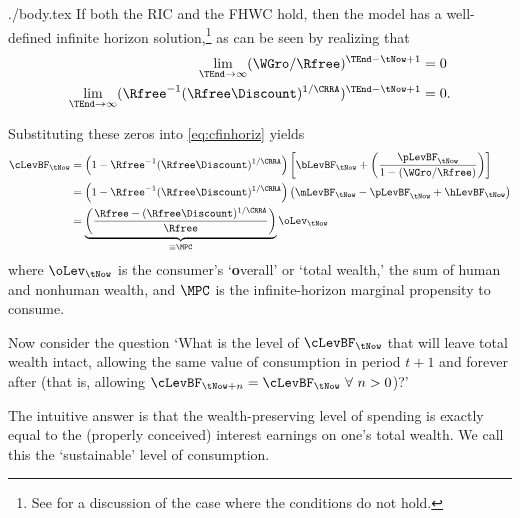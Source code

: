 \documentclass{handout}
\begin{document}
\begin{verbatimwrite}{./body.tex}
If both the RIC and the FHWC hold, then the model has a well-defined 
infinite horizon solution,\footnote{See \cite{BufferStockTheory} for a discussion of the case where the conditions do not hold.} as can be seen by realizing that 
\begin{equation}\begin{gathered}\begin{aligned}
   \lim_{\TEnd \rightarrow \infty} ({\WGro}/\Rfree)^{\TEnd-\tNow+1} & =  0
\\ \lim_{\TEnd \rightarrow \infty} (\Rfree^{-1}(\Rfree\Discount)^{1/\CRRA})^{\TEnd-\tNow+1} & = 0
.
\end{aligned}\end{gathered}\end{equation}

Substituting these zeros into \eqref{eq:cfinhoriz} yields 
\begin{equation}\begin{gathered}\begin{aligned}
        \cLevBF_{\tNow} & =  \left(1-\Rfree^{-1}(\Rfree\Discount)^{1/\CRRA}\right)\left[\bLevBF_{\tNow}+\left(\frac{\pLevBF_{\tNow}}{1-({\WGro}/\Rfree)}\right)\right] %
\\      & =  \left(1-\Rfree^{-1}(\Rfree\Discount)^{1/\CRRA}\right)\left(\mLevBF_{\tNow}-\pLevBF_{\tNow}+\hLevBF_{\tNow}\right)  %
\\      & =  \underbrace{\left(\frac{\Rfree -(\Rfree\Discount)^{1/\CRRA}}{\Rfree}\right)}_{ \equiv \MPC} \oLev_{\tNow} \label{eq:cOfw}
\end{aligned}\end{gathered}\end{equation}
where $\oLev_{\tNow}$ is the consumer's `{\bf o}verall' or `total wealth,' the sum of human and 
nonhuman wealth, and $\MPC$ is the infinite-horizon marginal propensity to consume.

Now consider the question `What is the level of $\cLevBF_{\tNow}$ that will 
leave total wealth intact, allowing the same value of consumption in 
period $t+1$ and forever after (that is, allowing $\cLevBF_{\tNow+n}=\cLevBF_{\tNow}~\forall~n>0$)?'  

The intuitive answer is that the wealth-preserving level of spending is exactly equal to the
(properly conceived) interest earnings on one's total
wealth.  We call this the `sustainable' level of consumption.  


\end{verbatimwrite}
\end{document}
